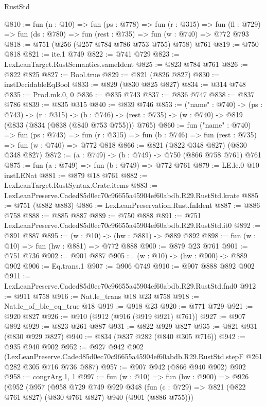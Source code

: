 \begin{lexlean}{RustStd}
\begin{coremodule}
@810 := fun (n : @10) =>
  fun (ps : @778) =>
  fun (r : @315) =>
  fun (fl : @729) => fun (ds : @780) => fun (rest : @735) => fun (w : @740) => @772 @793
@818 := @751 (@256 (@257 @784 @786 @753 @755) @758) @761
@819 := @750 @818
@821 := ite.{1} @749
@822 := @741 @729
@823 := LexLeanTarget.RustSemantics.sameIdent
@825 := @823 @784 @761
@826 := @822 @825
@827 := Bool.true
@829 := @821 (@826 @827)
@830 := instDecidableEqBool
@833 := @829 (@830 @825 @827)
@834 := @314 @748
@835 := Prod.mk.{0, 0}
@836 := @835 @743
@837 := @836 @747
@838 := @837 @786
@839 := @835 @315
@840 := @839 @746
@853 := ("name" : @740) ->
  (ps : @743) ->
  (r : @315) ->
  (b : @746) -> (rest : @735) -> (w : @740) -> @819 (@833 (@834 (@838 (@840 @753 @755))) @765)
@860 := fun ("name" : @740) =>
  fun (ps : @743) =>
  fun (r : @315) => fun (b : @746) => fun (rest : @735) => fun (w : @740) => @772 @818
@866 := @821 (@822 @348 @827) (@830 @348 @827)
@872 := (a : @749) -> (b : @749) -> @750 (@866 @758 @761) @761
@875 := fun (a : @749) => fun (b : @749) => @772 @761
@879 := LE.le.{0} @10 instLENat
@881 := @879 @18 @761
@882 := LexLeanTarget.RustSyntax.Crate.items
@883 := LexLeanPreserve.Caded85d0ec70c96655a45904ef60abdb.R29.RustStd.krate
@885 := @751 (@882 @883)
@886 := LexLeanPreservation.Rust.fnIdent
@887 := @886 @758
@888 := @885 @887
@889 := @750 @888
@891 := @751 LexLeanPreserve.Caded85d0ec70c96655a45904ef60abdb.R29.RustStd.it0
@892 := @891 @887
@895 := (w : @10) -> (hw : @881) -> @889 @892
@898 := fun (w : @10) => fun (hw : @881) => @772 @888
@900 := @879 @23 @761
@901 := @751 @736
@902 := @901 @887
@905 := (w : @10) -> (hw : @900) -> @889 @902
@906 := Eq.trans.{1}
@907 := @906 @749
@910 := @907 @888 @892 @902
@911 := LexLeanPreserve.Caded85d0ec70c96655a45904ef60abdb.R29.RustStd.fnd0
@912 := @911 @758
@916 := Nat.le_trans @18 @23 @758
@918 := Nat.le_of_ble_eq_true @18
@919 := @918 @23
@920 := @771 @729
@921 := @920 @827
@926 := @910 (@912 (@916 (@919 @921) @761))
@927 := @907 @892
@929 := @823 @261 @887
@931 := @822 @929 @827
@935 := @821 @931 (@830 @929 @827)
@940 := @834 (@837 @282 (@840 @305 @716))
@942 := @935 @940 @902
@952 := @927
    @942
    @902
    (LexLeanPreserve.Caded85d0ec70c96655a45904ef60abdb.R29.RustStd.stepF
      @261
      @282
      @305
      @716
      @736
      @887)
@957 := @907 @942 (@866 @940 @902) @902
@958 := congrArg.{1, 1}
@997 := fun (w : @10) =>
  fun (hw : @900) =>
  @926
    (@952
      (@957
        (@958
          @729
          @749
          @929
          @348
          (fun (c : @729) => @821 (@822 @761 @827) (@830 @761 @827) @940 (@901 (@886 @755)))

\end{coremodule}
\end{lexlean}
